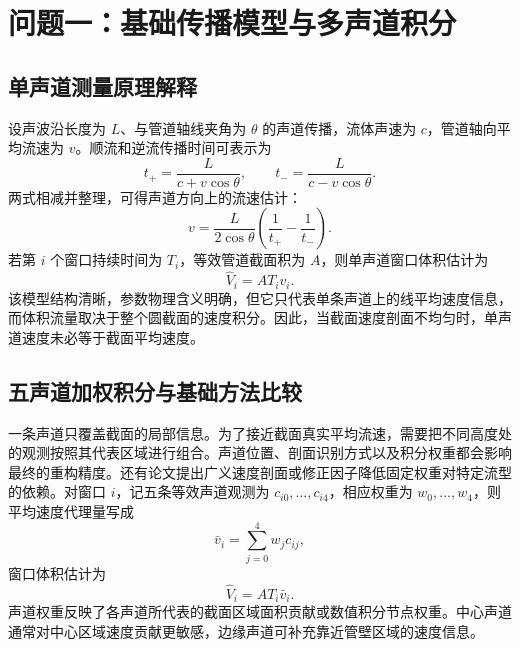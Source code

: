 \section{问题一：基础传播模型与多声道积分}

\subsection{单声道测量原理解释}

设声波沿长度为 $L$、与管道轴线夹角为 $\theta$ 的声道传播，流体声速为 $c$，管道轴向平均流速为 $v$。顺流和逆流传播时间可表示为
\begin{equation}
t_+ = \frac{L}{c + v\cos\theta}, \qquad
t_- = \frac{L}{c - v\cos\theta}.
\end{equation}
两式相减并整理，可得声道方向上的流速估计：
\begin{equation}
v = \frac{L}{2\cos\theta}\left(\frac{1}{t_+}-\frac{1}{t_-}\right).
\label{eq:single_velocity}
\end{equation}
若第 $i$ 个窗口持续时间为 $T_i$，等效管道截面积为 $A$，则单声道窗口体积估计为
\begin{equation}
\hat V_i = A T_i v_i.
\label{eq:single_volume}
\end{equation}
该模型结构清晰，参数物理含义明确，但它只代表单条声道上的线平均速度信息，而体积流量取决于整个圆截面的速度积分\cite{Sakhavi2022GeneralizedProfile}。因此，当截面速度剖面不均匀时，单声道速度未必等于截面平均速度。

\subsection{五声道加权积分与基础方法比较}

一条声道只覆盖截面的局部信息。为了接近截面真实平均流速，需要把不同高度处的观测按照其代表区域进行组合。声道位置、剖面识别方式以及积分权重都会影响最终的重构精度\cite{Qin2016ProfileIdentification,XiangMultipathIntegration}。还有论文提出广义速度剖面或修正因子降低固定权重对特定流型的依赖\cite{Sakhavi2022GeneralizedProfile,Gryshanova2023CorrectionFactor}。对窗口 $i$，记五条等效声道观测为 $c_{i0},\ldots,c_{i4}$，相应权重为 $w_0,\ldots,w_4$，则平均速度代理量写成
\begin{equation}
\bar v_i = \sum_{j=0}^{4} w_j c_{ij},
\end{equation}
窗口体积估计为
\begin{equation}
\hat V_i = A T_i \bar v_i.
\end{equation}
声道权重反映了各声道所代表的截面区域面积贡献或数值积分节点权重。中心声道通常对中心区域速度贡献更敏感，边缘声道可补充靠近管壁区域的速度信息。

